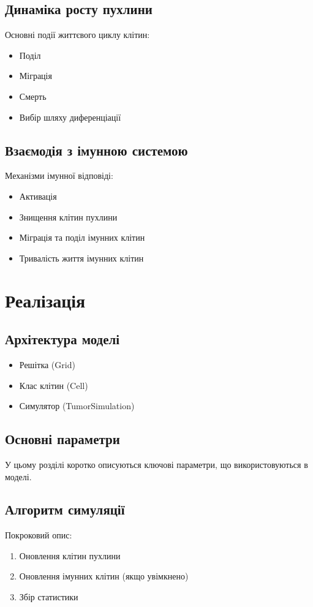 \documentclass{article}
\begin{document}
\subsection{Динаміка росту пухлини}
Основні події життєвого циклу клітин:
\begin{itemize}
    \item Поділ
    \item Міграція
    \item Смерть
    \item Вибір шляху диференціації
\end{itemize}

\subsection{Взаємодія з імунною системою}
Механізми імунної відповіді:
\begin{itemize}
    \item Активація
    \item Знищення клітин пухлини
    \item Міграція та поділ імунних клітин
    \item Тривалість життя імунних клітин
\end{itemize}

\section{Реалізація}
\subsection{Архітектура моделі}
\begin{itemize}
    \item Решітка (Grid)
    \item Клас клітин (Cell)
    \item Симулятор (TumorSimulation)
\end{itemize}

\subsection{Основні параметри}

У цьому розділі коротко описуються ключові параметри, що використовуються в моделі.

\subsection{Алгоритм симуляції}
Покроковий опис:
\begin{enumerate}
    \item Оновлення клітин пухлини
    \item Оновлення імунних клітин (якщо увімкнено)
    \item Збір статистики
\end{enumerate}
\end{document}
